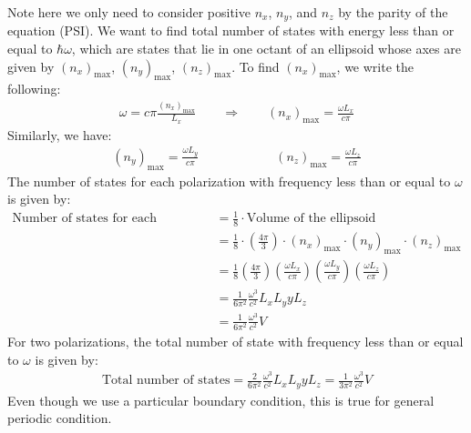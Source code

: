 \documentclass[11pt,oneside]{book}
\theoremstyle{break}
\theoremstyle{break}
\begin{document}
Note here we only need to consider positive $n_x$, $n_y$, and $n_z$ by the parity of the equation (PSI). We want to find total number of states with energy less than or equal to $\hbar \omega$, which are states that lie in one octant of an ellipsoid whose axes are given by $(n_x)_{\max}$, $(n_y)_{\max}$, $(n_z)_{\max}$. To find $(n_x)_{\max}$, we write the following:
\begin{align*}
\omega = c\pi \frac{(n_x)_{\max}}{L_x} \qquad \Rightarrow \qquad (n_x)_{\max} = \frac{\omega L_x}{c \pi}
\end{align*}
Similarly, we have:
\begin{align*}
(n_y)_{\max} = \frac{\omega L_y}{c\pi} \qquad\qquad\qquad (n_z)_{\max} = \frac{\omega L_z}{c\pi}
\end{align*}
The number of states for each polarization with frequency less than or equal to $\omega$ is given by:
\begin{align*}
\text{Number of states for each polarization} &= \frac{1}{8} \cdot \text{Volume of the ellipsoid} \\&= \frac{1}{8}\cdot  \left( \frac{4\pi}{3}\right)\cdot (n_x)_{\max} \cdot (n_y)_{\max}\cdot (n_z)_{\max}\\
&= \frac{1}{8}\left( \frac{4\pi}{3}\right)\left( \frac{\omega L_x}{c\pi}\right)\left( \frac{\omega L_y}{c\pi}\right)\left( \frac{\omega L_z}{c\pi}\right)\\
&= \frac{1}{6\pi^2}\frac{\omega^3}{c^2} L_xL_yyL_z\\
&= \frac{1}{6\pi^2}\frac{\omega^3}{c^2} V
\end{align*}
For two polarizations, the total number of state with frequency less than or equal to $\omega$ is given by:
\begin{align*}
\text{Total number of states} = \frac{2}{6\pi^2}\frac{\omega^3}{c^2} L_xL_yyL_z = \frac{1}{3\pi^2}\frac{\omega^3}{c^2} V
\end{align*}
Even though we use a particular boundary condition, this is true for general periodic condition. \\
\end{document}
